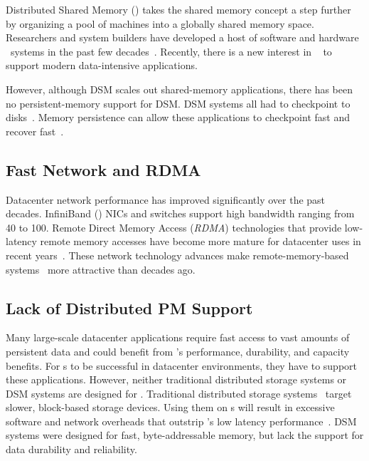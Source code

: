 Distributed Shared Memory ({\em \dsm}) takes the shared memory concept a step further 
by organizing a pool of machines into a globally shared memory space.
Researchers and system builders have developed a host of software and hardware \dsm\ systems in the past few 
decades~\cite{Bennett90-PPOPP,Bisiani90-ISCA,Black89-COMPCON,Delp:1988:AIM:59505,Fleisch89-SOSP,Gibbons91-SPAA,Kontothanassis97-ISCA,Lo94-AC,Kessler89-ACM,Keleher92-ISCA,Ramachandran91-Wiley,Zhou92-IEEE,Stumm90-IEEE,Stumm90-IPDPS,HLRC,Shasta}.
Recently, there is a new interest in \dsm~\cite{Nelson15-ATC} to support modern data-intensive applications.

However, although DSM scales out shared-memory applications, 
there has been no persistent-memory support for DSM.
DSM systems all had to checkpoint to disks~\cite{Stumm90,Richard93,Neves94}.
Memory persistence
can allow these applications to checkpoint fast and recover fast~\cite{Narayanan12-ASPLOS}.

\subsection{Fast Network and RDMA}
Datacenter network performance has improved significantly over the past decades.
InfiniBand ({\em \ib}) NICs and switches support high bandwidth ranging from 40 to 100\gbps.
Remote Direct Memory Access ({\em RDMA}) technologies that provide low-latency remote memory accesses
have become more mature for datacenter uses in recent years~\cite{FaSST,Dragojevic14-NSDI,Kalia14-SIGCOMM,Guo16-SIGCOMM}.
These network technology advances
make remote-memory-based systems~\cite{Nelson15-ATC,GU17-NSDI,OSDI-Disaggregate,Chen16-EUROSYS,Binnig16-VLDB,Zamanian17-VLDB} more attractive than decades ago.

\subsection{Lack of Distributed PM Support}



Many large-scale datacenter applications require fast access to vast amounts of persistent data
and could benefit from \nvm's performance, durability, and capacity benefits.
For \nvm{}s to be successful in datacenter environments, they have to support these applications.
However, neither traditional distributed storage systems or DSM systems are designed for \nvm.
Traditional distributed storage systems~\cite{AdyaEtAl-Farsite,calder11-azure,DeCandia+07-Dynamo,Ghemawat03-GoogleFS,KubiEtAl00-Ocean,Petersen97-Bayou}
target slower, block-based storage devices.
Using them on \nvm{}s will result in excessive software and network overheads that outstrip \nvm's low latency performance~\cite{Zhang15-Mojim}.
DSM systems were designed for fast, byte-addressable memory, but lack the support for data durability and reliability.

